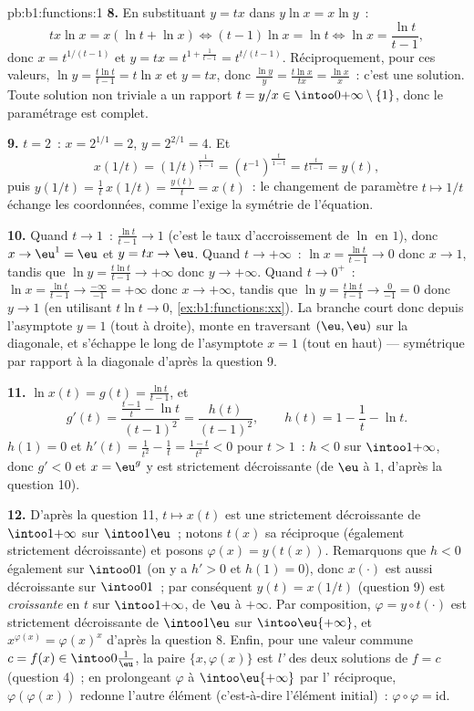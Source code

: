 \begin{solution}{pb:b1:functions:1}
\textbf{8.} En substituant $y = tx$ dans $y\ln x = x\ln y$~:
\[
tx\ln x = x(\ln t + \ln x)
\iff (t - 1)\ln x = \ln t
\iff \ln x = \frac{\ln t}{t - 1} ,
\]
donc $x = t^{1/(t-1)}$ et $y = tx = t^{1 + \frac1{t-1}} =
t^{t/(t-1)}$. Réciproquement, pour ces valeurs, $\ln y = \frac{t\ln
t}{t-1} = t\ln x$ et $y = tx$, donc $\frac{\ln y}y = \frac{t\ln
x}{tx} = \frac{\ln x}x$~: c'est une solution. Toute solution non
triviale a un rapport $t = y/x \in \intoo0{+\infty} \setminus \{1\}$,
donc le paramétrage est complet.

\textbf{9.} $t = 2$~: $x = 2^{1/1} = 2$, $y = 2^{2/1} = 4$. Et
\[
x(1/t) = (1/t)^{\frac1{\frac1t - 1}}
= (t^{-1})^{\frac{t}{1 - t}}
= t^{\frac{t}{t - 1}} = y(t) ,
\]
puis $y(1/t) = \frac1t\,x(1/t) = \frac{y(t)}t = x(t)$~: le changement
de paramètre $t \mapsto 1/t$ échange les coordonnées, comme l'exige
la symétrie de l'équation.

\textbf{10.} Quand $t \to 1$~: $\frac{\ln t}{t-1} \to 1$ (c'est le
taux d'accroissement de $\ln$ en $1$), donc $x \to \eu^1 = \eu$ et
$y = tx \to \eu$. Quand $t \to +\infty$~: $\ln x = \frac{\ln t}{t-1}
\to 0$ donc $x \to 1$, tandis que $\ln y = \frac{t\ln t}{t-1} \to
+\infty$ donc $y \to +\infty$. Quand $t \to 0^+$~: $\ln x = \frac{\ln
t}{t-1} \to \frac{-\infty}{-1} = +\infty$ donc $x \to +\infty$,
tandis que $\ln y = \frac{t\ln t}{t-1} \to \frac{0}{-1} = 0$ donc $y
\to 1$ (en utilisant $t\ln t \to 0$, \cref{ex:b1:functions:xx}). La
branche court donc depuis l'asymptote $y = 1$ (tout à droite), monte
en traversant $(\eu, \eu)$ sur la diagonale, et s'échappe le long de
l'asymptote $x = 1$ (tout en haut) --- symétrique par rapport à la
diagonale d'après la question 9.

\textbf{11.} $\ln x(t) = g(t) = \frac{\ln t}{t-1}$, et
\[
g'(t) = \frac{\frac{t-1}t - \ln t}{(t-1)^2}
= \frac{h(t)}{(t-1)^2},
\qquad h(t) = 1 - \frac1t - \ln t .
\]
$h(1) = 0$ et $h'(t) = \frac1{t^2} - \frac1t = \frac{1 -
t}{t^2} < 0$ pour $t > 1$~: $h < 0$ sur $\intoo1{+\infty}$, donc
$g' < 0$ et $x = \eu^g$ y est strictement décroissante (de $\eu$ à
$1$, d'après la question 10).

\textbf{12.} D'après la question 11, $t \mapsto x(t)$ est une
 strictement décroissante de $\intoo1{+\infty}$ sur
$\intoo1\eu$~; notons $t(x)$ sa réciproque (également strictement
décroissante) et posons $\varphi(x) = y(t(x))$. Remarquons que
$h < 0$ également sur $\intoo01$ (on y a $h' > 0$ et $h(1) = 0$),
donc $x(\cdot)$ est aussi décroissante sur $\intoo01$~; par
conséquent $y(t) = x(1/t)$ (question 9) est \emph{croissante} en $t$
sur $\intoo1{+\infty}$, de $\eu$ à $+\infty$. Par composition,
$\varphi = y \circ t(\cdot)$ est strictement décroissante de
$\intoo1\eu$ sur $\intoo\eu{+\infty}$, et $x^{\varphi(x)} =
\varphi(x)^x$ d'après la question 8. Enfin, pour une valeur commune
$c = f(x) \in \intoo0{\frac1\eu}$, la paire $\{x, \varphi(x)\}$ est
\emph{l'} des deux solutions de $f = c$ (question 4)~; en
prolongeant $\varphi$ à $\intoo\eu{+\infty}$ par l'
réciproque, $\varphi(\varphi(x))$ redonne l'autre élément
(c'est-à-dire l'élément initial)~: $\varphi \circ \varphi =
\mathrm{id}$.


\end{solution}
